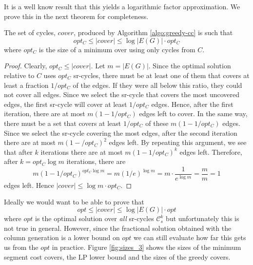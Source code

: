 It is a well know result that this yields a logarithmic factor approximation. We prove this in the next theorem
for completeness.

\begin{theorem}
The set of cycles, $cover$, produced by Algorithm \ref{algo:greedy-cc} is such that
$$
opt_C \leq |cover| \leq \log|E(G)| \cdot opt_C
$$
where $opt_C$ is the size of a minimum over using only cycles from $C$.
\end{theorem}

\begin{proof}
Clearly, $opt_C \leq |cover|$. Let $m = |E(G)|$. 
Since the optimal solution relative to $C$ uses $opt_C$ sr-cycles, there must be at least one of them that covers at
least a fraction $1 \slash opt_C$ of the edges. If they were all below this ratio, they could not cover all edges.
Since we select the sr-cycle that covers the most uncovered edges, the first sr-cycle will cover
at least $1 \slash opt_C$ edges. Hence, after the first iteration, there are at most $m (1 - 1 \slash opt_C)$ edges left to cover. In the same way,
there must be a set that covers at least $1 \slash opt_C$ of these $m (1 - 1 \slash opt_C)$ edges. Since we select the 
sr-cycle covering the most edges, after the second iteration there are at most $m(1 - \slash opt_C)^2$ edges left. By repeating this argument,
we see that after $k$ iterations there are at most $m (1 - 1 \slash opt_C)^k$ edges left. Therefore, after $k = opt_C \log m$ iterations,
there are
$$
m (1 - 1 \slash opt_C)^{opt_C \log m} = m (1 \slash e)^{\log m} = m \cdot \frac{1}{e^{\log m}} = \frac{m}{m} = 1
$$
edges left. Hence $|cover| \leq \log m \cdot opt_C$.
\end{proof}

Ideally we would want to be able to prove that
$$
opt \leq |cover| \leq \log|E(G)| \cdot opt
$$
where $opt$ is the optimal solution over \emph{all} sr-cycles $\mathcal{C}^k_s$ but unfortunately this is not true in general.
However, since the fractional solution obtained with the column generation is a lower bound on $opt$ we can still evaluate how far
this gets us from the $opt$ in practice. Figure \ref{fig:sizes_3} shows the sizes of the minimum segment cost covers, the LP lower bound
and the sizes of the greedy covers.

